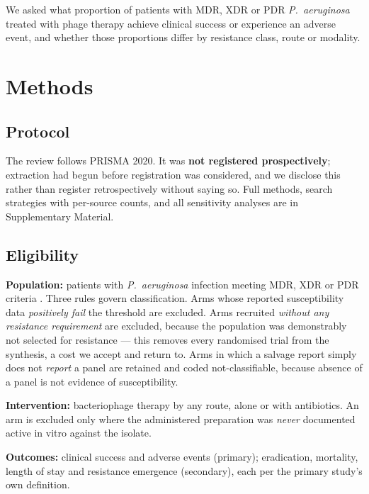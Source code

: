 \documentclass[12pt]{article}
\begin{document}
We asked what proportion of patients with MDR, XDR or PDR \textit{P.\ aeruginosa} treated with phage therapy achieve clinical success or experience an adverse event, and whether those proportions differ by resistance class, route or modality.

\section{Methods}

\subsection*{Protocol}

The review follows PRISMA 2020. It was \textbf{not registered prospectively}; extraction had begun before registration was considered, and we disclose this rather than register retrospectively without saying so. Full methods, search strategies with per-source counts, and all sensitivity analyses are in Supplementary Material.

\subsection*{Eligibility}

\textbf{Population:} patients with \textit{P.\ aeruginosa} infection meeting MDR, XDR or PDR criteria \parencite{Magiorakos2012_mdrxdr}. Three rules govern classification. Arms whose reported susceptibility data \emph{positively fail} the threshold are excluded. Arms recruited \emph{without any resistance requirement} are excluded, because the population was demonstrably not selected for resistance --- this removes every randomised trial from the synthesis, a cost we accept and return to. Arms in which a salvage report simply does not \emph{report} a panel are retained and coded not-classifiable, because absence of a panel is not evidence of susceptibility.

\textbf{Intervention:} bacteriophage therapy by any route, alone or with antibiotics. An arm is excluded only where the administered preparation was \emph{never} documented active in vitro against the isolate.

\textbf{Outcomes:} clinical success and adverse events (primary); eradication, mortality, length of stay and resistance emergence (secondary), each per the primary study's own definition.
\end{document}
